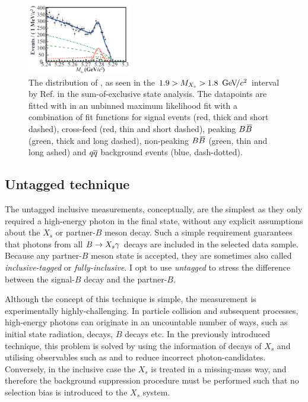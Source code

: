 \begin{figure}[htbp!]
    \centering
    \includegraphics[width=0.4\textwidth]{figures/experiment_overview/Mbc_sum_exclusive_Belle.png}
    \caption{\label{fig:mbc_sum_of_exclusive} 
    The distribution of \Mbc, as seen in the $1.9>M_{X_s}>1.8~{\mathrm{\,Ge\kern -0.1em V\!/}c^2}$ interval by Ref.\cite{Belle:2014nmp} in the sum-of-exclusive state analysis.
    The datapoints are fitted with in an unbinned maximum likelihood fit with a combination of fit functions for 
    signal events (red, thick and short dashed), 
    cross-feed (red, thin and short dashed), 
    peaking $B\kern 0.18em\overline{\kern -0.18em B}{}$ (green, thick and long dashed), 
    non-peaking $B\kern 0.18em\overline{\kern -0.18em B}{}$ (green, thin and long ashed)
    and $q\overline q$ background events (blue, dash-dotted).
    }
\end{figure}

\subsection{Untagged technique}\label{sec:untagged}
The untagged inclusive measurements, conceptually, are the simplest as they only required a high-energy photon in the final state, without any explicit assumptions about the $X_s$ or partner-$B$ meson decay.
Such a simple requirement guarantees that photons from all $\BtoXsgamma$ decays are included in the selected data sample.
Because any partner-$B$ meson state is accepted, they are sometimes also called \textit{inclusive-tagged} or \textit{fully-inclusive}.
I opt to use \textit{untagged} to stress the difference between the signal-$B$ decay and the partner-$B$.

Although the concept of this technique is simple, the measurement is experimentally highly-challenging.
In particle collision and subsequent processes, high-energy photons can originate in an uncountable number of ways, such as initial \epem state radiation, \epem\ra\qqbar decays, $B$ decays etc.
In the previously introduced  technique, this problem is solved by using the information of decays of $X_s$ and utilising observables such as \Mbc and \DeltaE to reduce incorrect photon-candidates. 
Conversely, in the inclusive case the $X_s$ is treated in a missing-mass way, and therefore the background suppression procedure must be performed such that no selection bias is introduced to the $X_s$ system.

